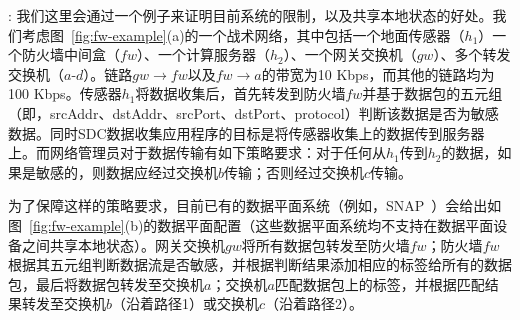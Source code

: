\documentclass{ctexart}
\newcommand{\para}[1]{\noindent {\bf #1}}%
\begin{document}
\para{研究动机}: 
我们这里会通过一个例子来证明目前系统的限制，以及共享本地状态的好处。我们考虑图~\ref{fig:fw-example}(a)的一个战术网络，其中包括一个地面传感器（$h_1$）一个防火墙中间盒（$fw$）、一个计算服务器（$h_2$）、一个网关交换机（$gw$）、多个转发交换机（$a$-$d$）。链路$gw\rightarrow fw$以及$fw \rightarrow a$的带宽为10 Kbps，而其他的链路均为100 Kbps。传感器$h_1$将数据收集后，首先转发到防火墙$fw$并基于数据包的五元组（即，srcAddr、dstAddr、srcPort、dstPort、protocol）判断该数据是否为敏感数据。同时SDC数据收集应用程序的目标是将传感器收集上的数据传到服务器上。而网络管理员对于数据传输有如下策略要求：对于任何从$h_1$传到$h_2$的数据，如果是敏感的，则数据应经过交换机$b$传输；否则经过交换机$c$传输。


为了保障这样的策略要求，目前已有的数据平面系统（例如，SNAP~\cite{arashloo2016snap}）会给出如图~\ref{fig:fw-example}(b)的数据平面配置（这些数据平面系统均不支持在数据平面设备之间共享本地状态）。网关交换机$gw$将所有数据包转发至防火墙$fw$；防火墙$fw$根据其五元组判断数据流是否敏感，并根据判断结果添加相应的标签给所有的数据包，最后将数据包转发至交换机$a$；交换机$a$匹配数据包上的标签，并根据匹配结果转发至交换机$b$（沿着路径1）或交换机$c$（沿着路径2）。

\end{document}
